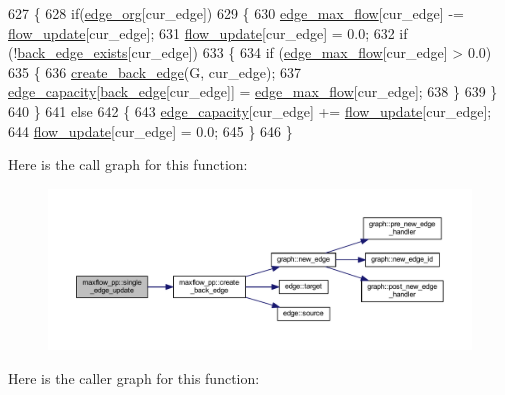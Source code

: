 \begin{DoxyCode}
627 \{
628     \textcolor{keywordflow}{if}(\mbox{\hyperlink{classmaxflow__pp_aca9ce457300e11b97cec3446315fda1c}{edge\_org}}[cur\_edge])
629     \{
630     \mbox{\hyperlink{classmaxflow__pp_a25d5bb2ab6c775a634dacf408ff55a83}{edge\_max\_flow}}[cur\_edge] -= \mbox{\hyperlink{classmaxflow__pp_ad37aff831935b2cfd4b03bc4a6da06ce}{flow\_update}}[cur\_edge];
631     \mbox{\hyperlink{classmaxflow__pp_ad37aff831935b2cfd4b03bc4a6da06ce}{flow\_update}}[cur\_edge] = 0.0;
632     \textcolor{keywordflow}{if} (!\mbox{\hyperlink{classmaxflow__pp_a50e9c82f1e720b8340ea4dc6d438f110}{back\_edge\_exists}}[cur\_edge])
633     \{
634         \textcolor{keywordflow}{if} (\mbox{\hyperlink{classmaxflow__pp_a25d5bb2ab6c775a634dacf408ff55a83}{edge\_max\_flow}}[cur\_edge] > 0.0)
635         \{
636         \mbox{\hyperlink{classmaxflow__pp_a20abf72dadaac19acb027ff5fa62de2a}{create\_back\_edge}}(G, cur\_edge);
637         \mbox{\hyperlink{classmaxflow__pp_af3cdc4999a86322271a80b1855d58629}{edge\_capacity}}[\mbox{\hyperlink{classmaxflow__pp_a9fdef5a86459eaf9634737094f3de250}{back\_edge}}[cur\_edge]] = \mbox{\hyperlink{classmaxflow__pp_a25d5bb2ab6c775a634dacf408ff55a83}{edge\_max\_flow}}[cur\_edge];
638         \}
639     \}
640     \}
641     \textcolor{keywordflow}{else}
642     \{
643     \mbox{\hyperlink{classmaxflow__pp_af3cdc4999a86322271a80b1855d58629}{edge\_capacity}}[cur\_edge] += \mbox{\hyperlink{classmaxflow__pp_ad37aff831935b2cfd4b03bc4a6da06ce}{flow\_update}}[cur\_edge];
644     \mbox{\hyperlink{classmaxflow__pp_ad37aff831935b2cfd4b03bc4a6da06ce}{flow\_update}}[cur\_edge] = 0.0;
645     \}
646 \}
\end{DoxyCode}
Here is the call graph for this function\+:\nopagebreak
\begin{figure}[H]
\begin{center}
\leavevmode
\includegraphics[width=350pt]{classmaxflow__pp_a3e59652a416d1553f8a1d1229dd2cd38_cgraph}
\end{center}
\end{figure}
Here is the caller graph for this function\+:\nopagebreak
